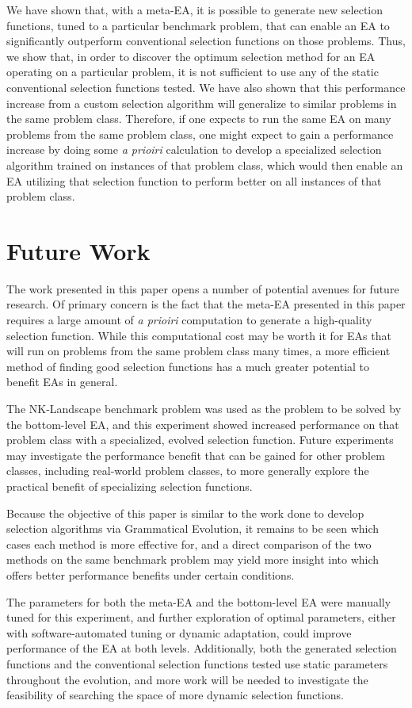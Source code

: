 \documentclass[sigconf]{acmart}
\begin{document}
We have shown that, with a meta-EA, it is possible to generate new selection functions, tuned to a particular benchmark problem, that can enable an EA to significantly outperform conventional selection functions on those problems. Thus, we show that, in order to discover the optimum selection method for an EA operating on a particular problem, it is not sufficient to use any of the static conventional selection functions tested. We have also shown that this performance increase from a custom selection algorithm will generalize to similar problems in the same problem class. Therefore, if one expects to run the same EA on many problems from the same problem class, one might expect to gain a performance increase by doing some \textit{a prioiri} calculation to develop a specialized selection algorithm trained on instances of that problem class, which would then enable an EA utilizing that selection function to perform better on all instances of that problem class.

\section{Future Work}
\label{Future Work}

The work presented in this paper opens a number of potential avenues for future research. Of primary concern is the fact that the meta-EA presented in this paper requires a large amount of \textit{a prioiri} computation to generate a high-quality selection function. While this computational cost may be worth it for EAs that will run on problems from the same problem class many times, a more efficient method of finding good selection functions has a much greater potential to benefit EAs in general. 

The NK-Landscape benchmark problem was used as the problem to be solved by the bottom-level EA, and this experiment showed increased performance on that problem class with a specialized, evolved selection function. Future experiments may investigate the performance benefit that can be gained for other problem classes, including real-world problem classes, to more generally explore the practical benefit of specializing selection functions.

Because the objective of this paper is similar to the work done to develop selection algorithms via Grammatical Evolution, it remains to be seen which cases each method is more effective for, and a direct comparison of the two methods on the same benchmark problem may yield more insight into which offers better performance benefits under certain conditions.

The parameters for both the meta-EA and the bottom-level EA were manually tuned for this experiment, and further exploration of optimal parameters, either with software-automated tuning or dynamic adaptation, could improve performance of the EA at both levels. Additionally, both the generated selection functions and the conventional selection functions tested use static parameters throughout the evolution, and more work will be needed to investigate the feasibility of searching the space of more dynamic selection functions.


 
\end{document}

